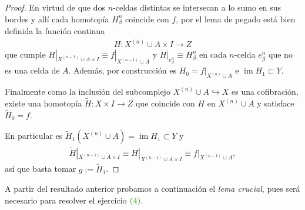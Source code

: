 \documentclass[11pt]{article}
\newcommand{\im}{\operatorname{im}}
\newcommand{\paint}[1]{\color{color}{#1}}
\begin{document}
\begin{proof}
En virtud de que dos $n$-celdas distintas se intersecan a lo sumo en sus bordes y allí cada homotopía $H_\beta^n$ coincide con $f$, por el lema de pegado está bien definida la función continua
\begin{align*}
H : X^{(n)} \cup A \times I \to Z
\end{align*}
que cumple $H|_{X^{(n-1)} \cup A \times I} \equiv f|_{X^{(n-1)} \cup A}$ y $H|_{e_\beta^n} \equiv H_\beta^n$ en cada $n$-celda $e_\beta^n$ que no es una celda de $A$. Además, por construcción es $H_0 = f|_{X^{(n)} \cup A}$ e $\im H_1 \subset Y$.

Finalmente como la inclusión del subcomplejo $X^{(n)} \cup A \hookrightarrow X$ es una cofibración, existe una homotopía $\tilde{H} : X \times I \to Z$ que coincide con $H$ en $X^{(n)} \cup A$ y satisface $\tilde{H}_0 = f$.
\begin{center}
\end{center}
En particular es $\tilde{H}_1(X^{(n)}\cup A) = \im H_1 \subset Y$ y
\begin{align*}
\tilde{H}|_{X^{(n-1)} \cup A \times I} \equiv H|_{X^{(n-1)} \cup A \times I}\equiv f|_{X^{(n-1)} \cup A},
\end{align*}
así que basta tomar $g := \tilde{H}_1$.

\end{proof}
\newpage

A partir del resultado anterior probamos a continuación el \textit{lema crucial}, pues será necesario para resolver el ejercicio $\paint{(4)}$.
\end{document}
